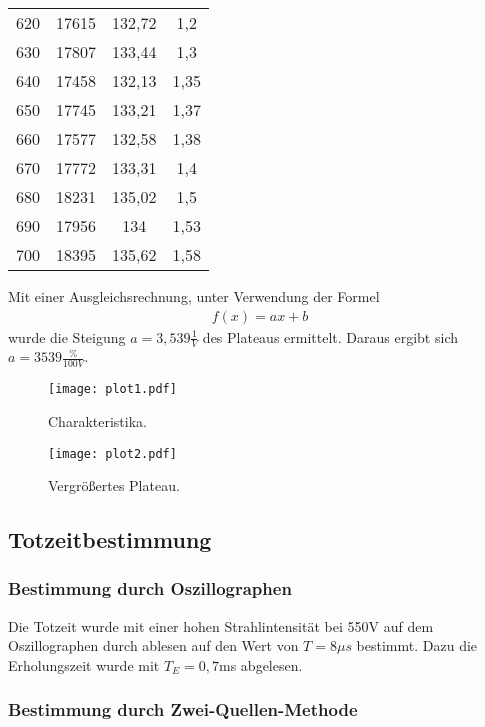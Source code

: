 \begin{table}
\begin{tabular}{c c c c}
  620 & 17615 & 132,72 & 1,2 \\
  630 & 17807 & 133,44 & 1,3 \\
  640 & 17458 & 132,13 & 1,35 \\
  650 & 17745 & 133,21 & 1,37 \\
  660 & 17577 & 132,58 & 1,38 \\
  670 & 17772 & 133,31 & 1,4 \\
  680 & 18231 & 135,02 & 1,5 \\
  690 & 17956 & 134 & 1,53 \\
  700 & 18395 & 135,62 & 1,58 \\
  \bottomrule
\end{tabular}
\end{table}
\FloatBarrier

Mit einer Ausgleichsrechnung, unter Verwendung der Formel
\begin{align*}
  f(x)=ax+b
\end{align*}
wurde die Steigung $a = 3,539 \frac{1}{V}$ des Plateaus ermittelt.
Daraus ergibt sich $a = 3539 \frac{\%}{100V}$.

\begin{figure}
  \centering
  \texttt{[image: plot1.pdf]}
  \caption{Charakteristika.}
  \label{fig:plot1}
\end{figure}
\FloatBarrier
\begin{figure}
  \centering
  \texttt{[image: plot2.pdf]}
  \caption{Vergrößertes Plateau.}
  \label{fig:plot2}
\end{figure}
\FloatBarrier

\subsection{Totzeitbestimmung}
\label{sec:totzeit}

\subsubsection{Bestimmung durch Oszillographen}
\label{sec:oszi}

Die Totzeit wurde mit einer hohen Strahlintensität bei 550V auf dem Oszillographen durch ablesen auf den Wert von $T = 8 \mu s$ bestimmt.
Dazu die Erholungszeit wurde mit $T_E=0,7$ms abgelesen.

\subsubsection{Bestimmung durch Zwei-Quellen-Methode}
\label{sec:zwquellen}

